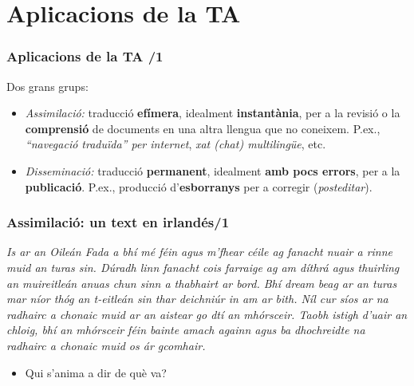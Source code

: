 \documentclass{beamer}
\newcommand{\empha}[1]{\emph{#1}\/}
\begin{document}

\section{Aplicacions de la TA}
\begin{frame}
\frametitle{ Aplicacions de la TA /1}


Dos grans grups:
\begin{itemize} 

\item\empha{Assimilació:} traducció \textbf{efímera},
    idealment \textbf{instantània}, per a la revisió o la
    \textbf{comprensió} de documents en una altra llengua que no
    coneixem. P.ex., \empha{``navegació traduïda'' per internet}, \empha{xat
      (\textit{chat}) multilingüe}, etc.

  \item\empha{Disseminació:} traducció \textbf{permanent}, idealment
    \textbf{amb pocs errors}, per a la \textbf{publicació}. P.ex.,
    producció d'\textbf{esborranys} per a corregir (\textit{posteditar}).
\end{itemize}

\end{frame}
\begin{frame}
  \frametitle{Assimilació: un text en irlandés/1}

  \empha{Is ar an Oileán Fada a bhí mé féin agus m’fhear céile ag fanacht
  nuair a rinne muid an turas sin. Dúradh linn fanacht cois farraige
  ag am díthrá agus thuirling an muireitleán anuas chun sinn a
  thabhairt ar bord. Bhí dream beag ar an turas mar níor thóg an
  t-eitleán sin thar deichniúr in am ar bith. Níl cur síos ar na
  radhairc a chonaic muid ar an aistear go dtí an mhórsceir.  Taobh
  istigh d’uair an chloig, bhí an mhórsceir féin bainte amach againn
  agus ba dhochreidte na radhairc a chonaic muid os ár gcomhair.}
\begin{itemize}
\item Qui s'anima a dir de què va?

\end{itemize}
  \end{frame}
\end{document}
